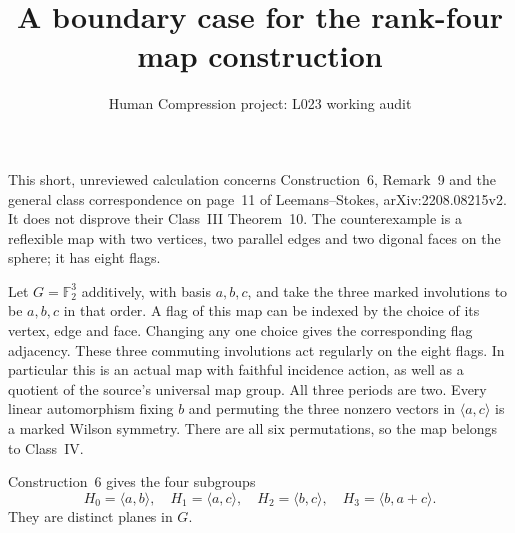 \documentclass[11pt,a4paper]{article}
\title{A boundary case for the rank-four map construction}
\author{Human Compression project: L023 working audit}\date{}
\begin{document}
\maketitle
This short, unreviewed calculation concerns Construction~6, Remark~9 and
the general class correspondence on page~11 of Leemans--Stokes,
arXiv:2208.08215v2. It does not disprove their Class~III Theorem~10.
The counterexample is a reflexible map with two vertices, two parallel
edges and two digonal faces on the sphere; it has eight flags.

Let $G=\mathbb F_2^3$ additively, with basis $a,b,c$, and take the
three marked involutions to be $a,b,c$ in that order. A flag of this map
can be indexed by the choice of its vertex, edge and face. Changing any
one choice gives the corresponding flag adjacency. These three commuting
involutions act regularly on the eight flags. In particular this is an
actual map with faithful incidence action, as well as a quotient of the
source's universal map group. All three periods are two.
Every linear automorphism fixing $b$ and permuting the three nonzero
vectors in $\langle a,c\rangle$ is a marked Wilson symmetry. There
are all six permutations, so the map belongs to Class~IV.

Construction~6 gives the four subgroups
\[
 H_0=\langle a,b\rangle,\quad H_1=\langle a,c\rangle,
 \quad H_2=\langle b,c\rangle,\quad H_3=\langle b,a+c\rangle.
\]
They are distinct planes in $G$.
\end{document}
